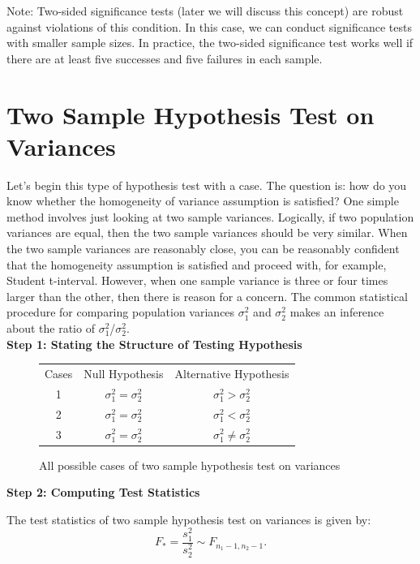 Note: Two-sided significance tests (later we will discuss this concept) are robust against violations of this condition. In this case, we can conduct significance tests with smaller sample sizes. In practice, the two-sided significance test works well if there are at least five successes and five failures in each sample.

\section{Two Sample Hypothesis Test on Variances}

Let's begin this type of hypothesis test with a case. The question is: how do you know whether the homogeneity of variance assumption is satisﬁed? One simple method involves just looking at two sample variances. Logically, if two population variances are equal, then the two sample variances should be very similar. When the two sample variances are reasonably close, you can be reasonably conﬁdent that the homogeneity assumption is satisﬁed and proceed with, for example, Student t-interval. However, when one sample variance is three or four times larger than the other, then there is reason for a concern. The common statistical procedure for comparing population variances $\sigma_1^2$ and $\sigma_2^2$ makes an inference about the ratio of $\sigma_1^2$/$\sigma_2^2$.\\

\textbf{Step 1: Stating the Structure of Testing Hypothesis}

\begin{center}
\begin{figure}[H]
\centering
\begin{tabular}{ c c c }
Cases & Null Hypothesis & Alternative Hypothesis \\
     1	   & $\sigma_1^2 = \sigma_2^2$ & $\sigma_1^2 > \sigma_2^2$ \\
     2	   & $\sigma_1^2 = \sigma_2^2$ & $\sigma_1^2 < \sigma_2^2$ \\
     3    & $\sigma_1^2 = \sigma_2^2$ & $\sigma_1^2 \neq \sigma_2^2$ \\
\end{tabular}
\caption{All possible cases of two sample hypothesis test on variances}
\end{figure}
\end{center}
\vspace{-0.75cm}

\textbf{Step 2: Computing Test Statistics}

\begin{definition}
The test statistics of two sample hypothesis test on variances is given by: \[ F_* = \frac{s_1^2}{s_2^2} \sim F_{n_1-1,n_2-1}.\]
\end{definition}


